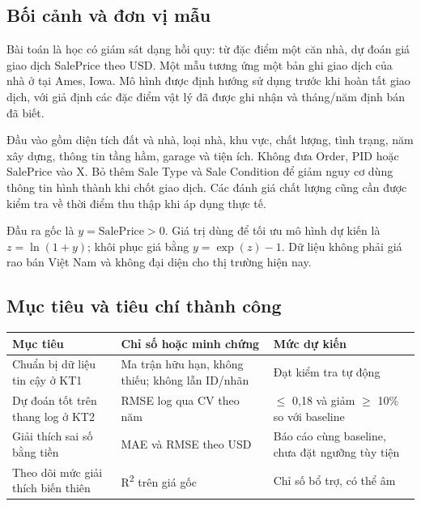 \documentclass[12pt,a4paper]{article}
\begin{document}
\subsection{Bối cảnh và đơn vị mẫu}

Bài toán là học có giám sát dạng hồi quy: từ đặc điểm một căn nhà, dự đoán giá giao dịch SalePrice theo USD. Một mẫu tương ứng một bản ghi giao dịch của nhà ở tại Ames, Iowa. Mô hình được định hướng sử dụng trước khi hoàn tất giao dịch, với giả định các đặc điểm vật lý đã được ghi nhận và tháng/năm định bán đã biết.


Đầu vào gồm diện tích đất và nhà, loại nhà, khu vực, chất lượng, tình trạng, năm xây dựng, thông tin tầng hầm, garage và tiện ích. Không đưa Order, PID hoặc SalePrice vào X. Bỏ thêm Sale Type và Sale Condition để giảm nguy cơ dùng thông tin hình thành khi chốt giao dịch. Các đánh giá chất lượng cũng cần được kiểm tra về thời điểm thu thập khi áp dụng thực tế.


Đầu ra gốc là $y=\mathrm{SalePrice}>0$. Giá trị dùng để tối ưu mô hình
dự kiến là $z=\ln(1+y)$; khôi phục giá bằng $y=\exp(z)-1$.
Dữ liệu không phải giá rao bán Việt Nam và không đại diện cho thị trường hiện nay.

\subsection{Mục tiêu và tiêu chí thành công}

\begingroup\small\setlength{\tabcolsep}{5pt}
\begin{tabularx}{\linewidth}{@{}YYY@{}}\toprule

\textbf{Mục tiêu} & \textbf{Chỉ số hoặc minh chứng} & \textbf{Mức dự kiến}\\

\midrule

Chuẩn bị dữ liệu tin cậy ở KT1 & Ma trận hữu hạn, không thiếu; không lẫn ID/nhãn & Đạt kiểm tra tự động\\

Dự đoán tốt trên thang log ở KT2 & RMSE log qua CV theo năm & \ensuremath{\leq} 0,18 và giảm \ensuremath{\geq} 10\% so với baseline\\

Giải thích sai số bằng tiền & MAE và RMSE theo USD & Báo cáo cùng baseline, chưa đặt ngưỡng tùy tiện\\

Theo dõi mức giải thích biến thiên & R\textsuperscript{2} trên giá gốc & Chỉ số bổ trợ, có thể âm\\

\bottomrule\end{tabularx}\endgroup\par
\end{document}
